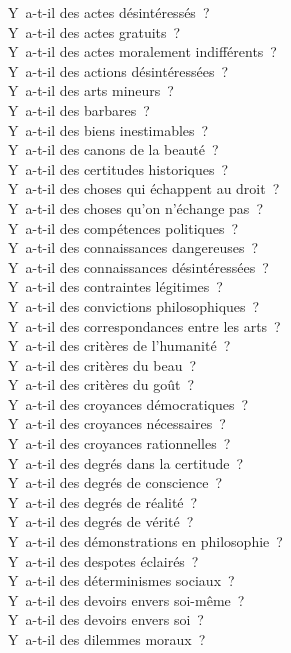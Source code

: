 \documentclass[a4paper,12pt]{article}
\begin{document}
Y a-t-il des actes désintéressés ? \\
Y a-t-il des actes gratuits ? \\
Y a-t-il des actes moralement indifférents ? \\
Y a-t-il des actions désintéressées ? \\
Y a-t-il des arts mineurs ? \\
Y a-t-il des barbares ? \\
Y a-t-il des biens inestimables ? \\
Y a-t-il des canons de la beauté ? \\
Y a-t-il des certitudes historiques ? \\
Y a-t-il des choses qui échappent au droit ? \\
Y a-t-il des choses qu'on n'échange pas ? \\
Y a-t-il des compétences politiques ? \\
Y a-t-il des connaissances dangereuses ? \\
Y a-t-il des connaissances désintéressées ? \\
Y a-t-il des contraintes légitimes ? \\
Y a-t-il des convictions philosophiques ? \\
Y a-t-il des correspondances entre les arts ? \\
Y a-t-il des critères de l'humanité ? \\
Y a-t-il des critères du beau ? \\
Y a-t-il des critères du goût ? \\
Y a-t-il des croyances démocratiques ? \\
Y a-t-il des croyances nécessaires ? \\
Y a-t-il des croyances rationnelles ? \\
Y a-t-il des degrés dans la certitude ? \\
Y a-t-il des degrés de conscience ? \\
Y a-t-il des degrés de réalité ? \\
Y a-t-il des degrés de vérité ? \\
Y a-t-il des démonstrations en philosophie ? \\
Y a-t-il des despotes éclairés ? \\
Y a-t-il des déterminismes sociaux ? \\
Y a-t-il des devoirs envers soi-même ? \\
Y a-t-il des devoirs envers soi ? \\
Y a-t-il des dilemmes moraux ? \\
\end{document}

